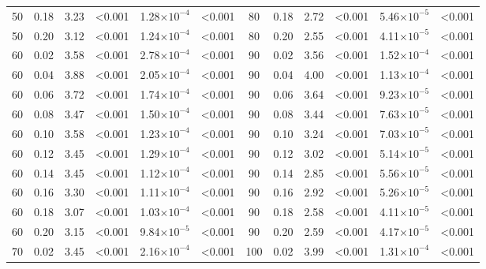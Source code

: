 \documentclass[12pt]{article}
\begin{document}
\begin{table}[h!]
\begin{tabular}{c c | c c| c c ||c c | c c | c c |}
	        50	&	0.18	&	3.23	&	\textless0.001	&	1.28$\times10^{-4}$	&	\textless0.001	&	80	&	0.18	&	2.72	&	\textless0.001	&	5.46$\times10^{-5}$	&	\textless0.001	\\
	        50	&	0.20	&	3.12	&	\textless0.001	&	1.24$\times10^{-4}$	&	\textless0.001	&	80	&	0.20	&	2.55	&	\textless0.001	&	4.11$\times10^{-5}$	&	\textless0.001	\\
	        60	&	0.02	&	3.58	&	\textless0.001	&	2.78$\times10^{-4}$	&	\textless0.001	&	90	&	0.02	&	3.56	&	\textless0.001	&	1.52$\times10^{-4}$	&	\textless0.001	\\
	        60	&	0.04	&	3.88	&	\textless0.001	&	2.05$\times10^{-4}$	&	\textless0.001	&	90	&	0.04	&	4.00	&	\textless0.001	&	1.13$\times10^{-4}$	&	\textless0.001	\\
	        60	&	0.06	&	3.72	&	\textless0.001	&	1.74$\times10^{-4}$	&	\textless0.001	&	90	&	0.06	&	3.64	&	\textless0.001	&	9.23$\times10^{-5}$	&	\textless0.001	\\
	        60	&	0.08	&	3.47	&	\textless0.001	&	1.50$\times10^{-4}$	&	\textless0.001	&	90	&	0.08	&	3.44	&	\textless0.001	&	7.63$\times10^{-5}$	&	\textless0.001	\\
	        60	&	0.10	&	3.58	&	\textless0.001	&	1.23$\times10^{-4}$	&	\textless0.001	&	90	&	0.10	&	3.24	&	\textless0.001	&	7.03$\times10^{-5}$	&	\textless0.001	\\
	        60	&	0.12	&	3.45	&	\textless0.001	&	1.29$\times10^{-4}$	&	\textless0.001	&	90	&	0.12	&	3.02	&	\textless0.001	&	5.14$\times10^{-5}$	&	\textless0.001	\\
	        60	&	0.14	&	3.45	&	\textless0.001	&	1.12$\times10^{-4}$	&	\textless0.001	&	90	&	0.14	&	2.85	&	\textless0.001	&	5.56$\times10^{-5}$	&	\textless0.001	\\
	        60	&	0.16	&	3.30	&	\textless0.001	&	1.11$\times10^{-4}$	&	\textless0.001	&	90	&	0.16	&	2.92	&	\textless0.001	&	5.26$\times10^{-5}$	&	\textless0.001	\\
	        60	&	0.18	&	3.07	&	\textless0.001	&	1.03$\times10^{-4}$	&	\textless0.001	&	90	&	0.18	&	2.58	&	\textless0.001	&	4.11$\times10^{-5}$	&	\textless0.001	\\
	        60	&	0.20	&	3.15	&	\textless0.001	&	9.84$\times10^{-5}$	&	\textless0.001	&	90	&	0.20	&	2.59	&	\textless0.001	&	4.17$\times10^{-5}$	&	\textless0.001	\\
	        70	&	0.02	&	3.45	&	\textless0.001	&	2.16$\times10^{-4}$	&	\textless0.001	&	100	&	0.02	&	3.99	&	\textless0.001	&	1.31$\times10^{-4}$	&	\textless0.001	\\

\end{tabular}
\end{table}
\end{document}
